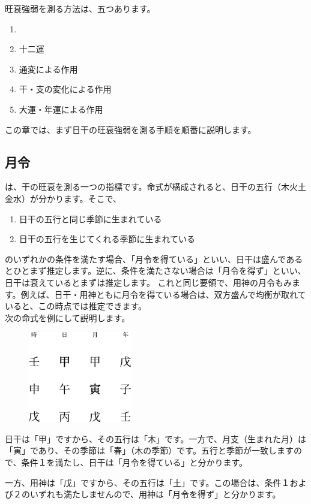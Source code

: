 \documentclass[a5paper,11pt,dvipdfmx]{tarticle}
\begin{document}
旺衰強弱を測る方法は、五つあります。

\begin{enumerate}
\item {}
\item 十二運
\item 通変による作用
\item 干・支の変化による作用
\item 大運・年運による作用
\end{enumerate}

この章では、まず日干の旺衰強弱を測る手順を順番に説明します。

\subsection{月令}
は、干の旺衰を測る一つの指標です。命式が構成されると、日干の五行（木火土金水）が分かります。そこで、
\begin{enumerate}
\item 日干の五行と同じ季節に生まれている
\item 日干の五行を生じてくれる季節に生まれている
\end{enumerate}
のいずれかの条件を満たす場合、「月令を得ている」といい、日干は盛んであるとひとまず推定します。逆に、条件を満たさない場合は「月令を得ず」といい、日干は衰えているとまずは推定します。
これと同じ要領で、用神の月令もみます。例えば、日干・用神ともに月令を得ている場合は、双方盛んで均衡が取れていると、この時点では推定できます。\\

次の命式を例にして説明します。

\begin{figure}[h]
  \includegraphics[width=45mm,angle=90]{figs/figure6-1.eps}
\end{figure}

日干は「甲」ですから、その五行は「木」です。一方で、月支（生まれた月）は「寅」であり、その季節は「春」（木の季節）です。五行と季節が一致しますので、条件１を満たし、日干は「月令を得ている」と分かります。

一方、用神は「戊」ですから、その五行は「土」です。この場合は、条件１および２のいずれも満たしませんので、用神は「月令を得ず」と分かります。
\end{document}
